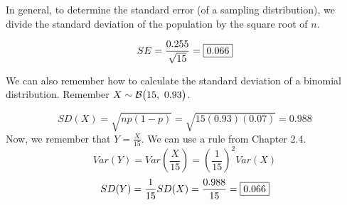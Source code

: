 \documentclass[12pt,letterpaper]{article}
\begin{document}
\begin{enumerate}
In general, to determine the standard error (of a sampling distribution), we divide the standard deviation of the population by the square root of $n$.

$$SE = \frac{0.255}{\sqrt{15}} = \fbox{0.066} $$

We can also remember how to calculate the standard deviation of a binomial distribution. Remember $X\sim\mathcal{B}\big(15,~0.93\big)$.

$$SD(X) = \sqrt{np(1-p)} = \sqrt{15(0.93)(0.07)} = 0.988$$
Now, we remember that $Y = \frac{X}{15}$. We can use a rule from Chapter 2.4.
$$Var(Y) = Var\left(\frac{X}{15}\right) = \left(\frac{1}{15}\right)^2Var(X)$$
$$SD(Y) =  \frac{1}{15}SD(X) = \frac{0.988}{15} = \fbox{0.066}$$

\end{enumerate}
\end{document}
